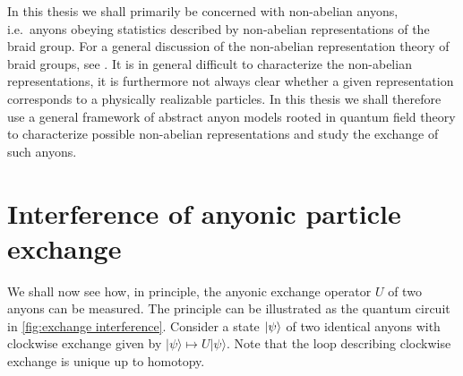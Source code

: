 \documentclass[a4paper,10pt,oneside]{book}
\theoremstyle{plain}
\theoremstyle{definition}
\theoremstyle{remark}
\DeclarePairedDelimiter\ket{\lvert}{\rangle}
\begin{document}
In this thesis we shall primarily be concerned with non-abelian anyons, i.e.\ anyons obeying statistics described by non-abelian representations of the braid group. For a general discussion of the non-abelian representation theory of braid groups, see \cite{oskar}. It is in general difficult to characterize the non-abelian representations, it is furthermore not always clear whether a given representation corresponds to a physically realizable particles. In this thesis we shall therefore use a general framework of abstract anyon models rooted in quantum field theory to characterize possible non-abelian representations and study the exchange of such anyons.




































\section{Interference of anyonic particle exchange}

We shall now see how, in principle, the anyonic exchange operator $U$ of two anyons can be measured. The principle can be illustrated as the quantum circuit in \cref{fig:exchange interference}. Consider a state $\ket{\psi}$ of two identical anyons with clockwise exchange given by $|ψ⟩ ↦ U|ψ⟩$. Note that the loop describing clockwise exchange is unique up to homotopy.
\end{document}
